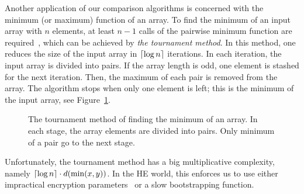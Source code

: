 	Another application of our comparison algorithms is concerned with the minimum (or maximum) function of an array.
	To find the minimum of an input array with $n$ elements, at least $n-1$ calls of the pairwise minimum function are required~\cite[Chapter 9]{CLR09}, which can be achieved by \emph{the tournament method}.
	In this method, one reduces the size of the input array in $\left\lceil \log n \right\rceil$ iterations.
	In each iteration, the input array is divided into pairs. 
	If the array length is odd, one element is stashed for the next iteration. 
	Then, the maximum of each pair is removed from the array.
	The algorithm stops when only one element is left; this is the minimum of the input array, see Figure~\ref{fig:minimum_tournament}. 
	\begin{figure}
		\centering
		\caption{The tournament method of finding the minimum of an array. In each stage, the array elements are divided into pairs. Only minimum of a pair go to the next stage.}
		\label{fig:minimum_tournament}
	\end{figure}
	Unfortunately, the tournament method has a big multiplicative complexity, namely $\left\lceil \log n \right\rceil \cdot d(\min(x,y))$.
	In the HE world, this enforces us to use either impractical encryption parameters~\cite{TMP15} or a slow bootstrapping function.

